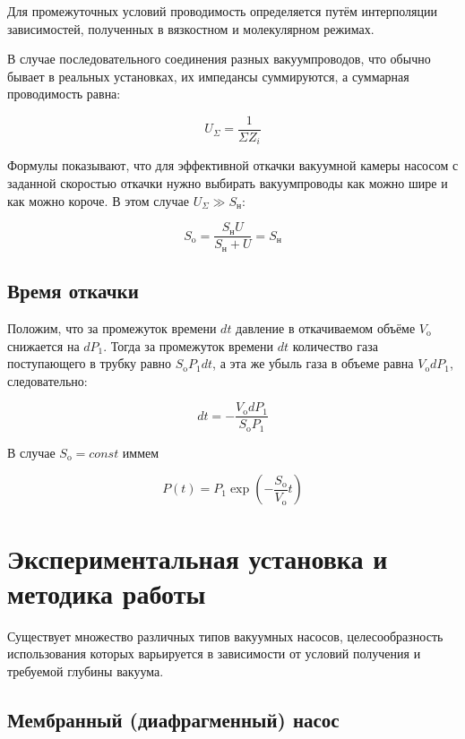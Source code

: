 \documentclass[a4paper, 12pt]{article} %
\begin{document}
Для промежуточных условий проводимость определяется путём
интерполяции зависимостей, полученных в вязкостном и молекулярном
режимах.

В случае последовательного соединения разных вакуумпроводов,
что обычно бывает в реальных установках, их импедансы суммируются,
а суммарная проводимость равна:

\begin{equation}
	U_{\Sigma} = \frac{1}{\Sigma Z_{i}}
\end{equation}

Формулы показывают, что для эффективной
откачки вакуумной камеры насосом с заданной скоростью откачки нужно
выбирать вакуумпроводы как можно шире и как можно короче. В этом
случае $U_{\Sigma} \gg S_{\text{н}}$:

\begin{equation}
	S_{\text{o}} = \frac{S_{\text{н}} U}{S_{\text{н}} + U} = S_{\text{н}}
\end{equation}

\subsection{Время откачки}

Положим, что за промежуток времени $dt$ давление
в откачиваемом объёме $V_{\text{o}}$ снижается на $dP_1$. Тогда за промежуток времени $dt$ количество газа поступающего в трубку равно $S_{\text{o}} P_1 dt$, а эта же
убыль газа в объеме равна $V_{\text{o}} dP_1$, следовательно:

\begin{equation}
	dt = - \frac{V_{\text{o}} dP_1}{S_{\text{o}}P_1}
\end{equation}

В случае $S_{\text{o}} = const$ иммем 

\begin{equation}
	P(t) = P_1 \exp \left( - \frac{S_{\text{o}}}{V_{\text{o}}}t \right)
\end{equation}


\section{Экспериментальная установка и методика работы}

Существует множество различных типов вакуумных насосов, целесообразность использования которых варьируется в зависимости от условий получения и требуемой глубины вакуума.

\subsection{Мембранный (диафрагменный) насос}
\end{document}
